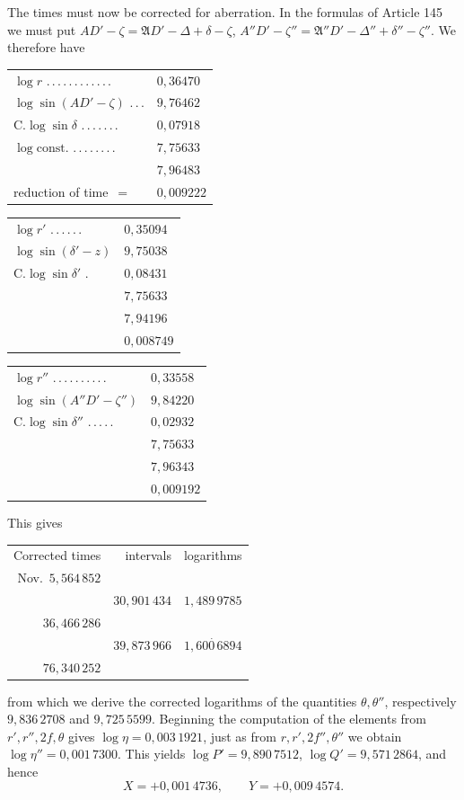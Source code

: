 The times must now be corrected for aberration. In the formulas of Article 145 we must put $AD'-\zeta=\mathfrak AD'-\Delta+\delta-\zeta$, $A''D'-\zeta''=\mathfrak A''D'-\Delta''+\delta''-\zeta''$. We therefore have
\begin{center}\begin{tabular}{ll}
$\log r$ .\,.\,.\,.\,.\,.\,.\,.\,.\,.\,.\,. & $0{,}36470$\\
$\log\sin(AD'-\zeta)$ .\,.\,. & $9{,}76462$\\
$\mathrm C.\log\sin\delta$ .\,.\,.\,.\,.\,.\,. & $0{,}07918$\\
$\log\mathrm{const.}$ .\,.\,.\,.\,.\,.\,.\,. & $7{,}75633$\\\hline
& $7{,}96483$\\
reduction of time\ $=$ & $0{,}009222$
\end{tabular}\end{center}
\begin{center}\begin{tabular}{ll}
$\log r'$ .\,.\,.\,.\,.\,. & $0{,}35094$\\
$\log\sin(\delta'-z)$ & $9{,}75038$\\
$\mathrm C.\log\sin\delta'$ . & $0{,}08431$\\
& $7{,}75633$\\\hline
& $7{,}94196$\\
& $0{,}008749$
\end{tabular}\end{center}
\begin{center}\begin{tabular}{ll}
$\log r''$ .\,.\,.\,.\,.\,.\,.\,.\,.\,. & $0{,}33558$\\
$\log\sin(A''D'-\zeta'')$ & $9{,}84220$\\
$\mathrm C.\log\sin\delta''$ .\,.\,.\,.\,. & $0{,}02932$\\
& $7{,}75633$\\\hline
& $7{,}96343$\\
& $0{,}009192$
\end{tabular}\end{center}
\noindent This gives
\begin{center}\begin{tabular}{r|r|r}
Corrected times & intervals & logarithms\\
Nov.\ $5{,}564\,852$ & &\\
& $30{,}901\,434$ & $1{,}489\,9785$\\
$36{,}466\,286$ & &\\
& $39{,}873\,966$ & $1{,}60\overset{.}{0}\,6894$\\
$76{,}340\,252$ & &
\end{tabular}\end{center}
\noindent from which we derive the corrected logarithms of the quantities $\theta,\theta''$, respectively $9{,}836\,2708$ and $9{,}725\,5599$. Beginning the computation of the elements from $r',r'',2f,\theta$ gives $\log\eta=0{,}003\,1921$, just as from $r,r',2f'',\theta''$ we obtain $\log\eta''=0{,}001\,7300$. This yields $\log P'=9{,}890\,7512$, $\log Q'=9{,}571\,2864$, and hence
\[X=+0{,}001\,4736,\qquad Y=+0{,}009\,4574.\]

